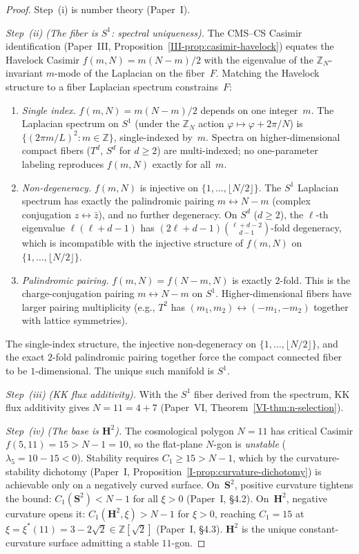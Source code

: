 \begin{proof}
Step~(i) is number theory (Paper~I).

\emph{Step~(ii) (The fiber is $S^1$: spectral uniqueness).}
The CMS--CS Casimir identification
(Paper~III, Proposition~\ref*{III-prop:casimir-havelock})
equates the Havelock Casimir $f(m,N) = m(N{-}m)/2$ with the
eigenvalue of the $\mathbb{Z}_N$-invariant $m$-mode of the
Laplacian on the fiber~$F$.  Matching the Havelock structure
to a fiber Laplacian spectrum constrains~$F$:
\begin{enumerate}
\item \emph{Single index.}
  $f(m,N) = m(N{-}m)/2$ depends on one integer~$m$.
  The Laplacian spectrum on $S^1$ (under the $\mathbb{Z}_N$
  action $\varphi \mapsto \varphi + 2\pi/N$) is
  $\{(2\pi m/L)^2 : m \in \mathbb{Z}\}$, single-indexed by~$m$.
  Spectra on higher-dimensional compact fibers ($T^d$, $S^d$
  for $d \ge 2$) are multi-indexed; no one-parameter labeling
  reproduces $f(m, N)$ exactly for all~$m$.
\item \emph{Non-degeneracy.}
  $f(m,N)$ is injective on $\{1,\ldots,\lfloor N/2\rfloor\}$.
  The $S^1$ Laplacian spectrum has exactly the palindromic
  pairing $m \leftrightarrow N{-}m$ (complex conjugation
  $z \leftrightarrow \bar z$), and no further degeneracy.
  On $S^d$ ($d \ge 2$), the $\ell$-th eigenvalue
  $\ell(\ell{+}d{-}1)$ has
  $(2\ell{+}d{-}1)\binom{\ell{+}d{-}2}{d{-}1}$-fold degeneracy,
  which is incompatible with the injective structure of
  $f(m, N)$ on $\{1,\ldots,\lfloor N/2\rfloor\}$.
\item \emph{Palindromic pairing.}
  $f(m, N) = f(N{-}m, N)$ is exactly $2$-fold.  This is the
  charge-conjugation pairing $m \leftrightarrow N{-}m$ on
  $S^1$.  Higher-dimensional fibers have larger pairing
  multiplicity (e.g., $T^2$ has $(m_1, m_2) \leftrightarrow
  (-m_1, -m_2)$ together with lattice symmetries).
\end{enumerate}
The single-index structure, the injective non-degeneracy
on $\{1,\ldots,\lfloor N/2\rfloor\}$, and the exact $2$-fold
palindromic pairing together force the compact connected
fiber to be $1$-dimensional.  The unique such manifold
is $S^1$.

\emph{Step~(iii) (KK flux additivity).}
With the $S^1$ fiber derived from the spectrum,
KK flux additivity gives $N = 11 = 4 + 7$
(Paper~VI, Theorem~\ref*{VI-thm:n-selection}).

\emph{Step~(iv) (The base is $\mathbf{H}^2$).}
The cosmological polygon $N = 11$ has critical Casimir
$f(5,11) = 15 > N{-}1 = 10$, so the flat-plane $N$-gon is
\emph{unstable} ($\lambda_5 = 10 - 15 < 0$).
Stability requires $C_1 \ge 15 > N{-}1$, which by the
curvature-stability dichotomy (Paper~I,
Proposition~\ref*{I-prop:curvature-dichotomy})
is achievable only on a negatively curved surface.
On~$\mathbf{S}^2$, positive curvature tightens the bound:
$C_1(\mathbf{S}^2) < N{-}1$ for all $\xi > 0$ (Paper~I, \S4.2).
On~$\mathbf{H}^2$, negative curvature opens it:
$C_1(\mathbf{H}^2, \xi) > N{-}1$ for $\xi > 0$, reaching
$C_1 = 15$ at $\xi = \xi^*(11) = 3 - 2\sqrt{2} \in \mathbb{Z}[\sqrt{2}]$
(Paper~I, \S4.3).
$\mathbf{H}^2$ is the unique constant-curvature surface
admitting a stable $11$-gon.


\end{proof}
